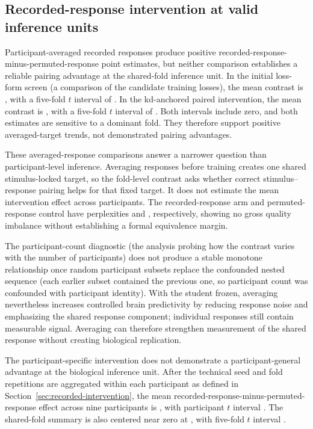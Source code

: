 \subsection{Recorded-response intervention at valid inference units}
\label{sec:results-recorded}

Participant-averaged recorded responses produce positive recorded-response-minus-permuted-response point estimates, but neither comparison establishes a reliable pairing advantage at the shared-fold inference unit.
In the initial loss-form screen (a comparison of the candidate training losses), the mean contrast is , with a five-fold \(t\) interval of .
In the \ac{kd}-anchored paired intervention, the mean contrast is , with a five-fold \(t\) interval of .
Both intervals include zero, and both estimates are sensitive to a dominant fold.
They therefore support positive averaged-target trends, not demonstrated pairing advantages.

These averaged-response comparisons answer a narrower question than participant-level inference.
Averaging responses before training creates one shared stimulus-locked target, so the fold-level contrast asks whether correct stimulus--response pairing helps for that fixed target.
It does not estimate the mean intervention effect across participants.
The recorded-response arm and permuted-response control have perplexities  and , respectively, showing no gross quality imbalance without establishing a formal equivalence margin.

The participant-count diagnostic (the analysis probing how the contrast varies with the number of participants) does not produce a stable monotone relationship once random participant subsets replace the confounded nested sequence (each earlier subset contained the previous one, so participant count was confounded with participant identity).
With the student frozen, averaging nevertheless increases controlled brain predictivity by reducing response noise and emphasizing the shared response component; individual responses still contain measurable signal.
Averaging can therefore strengthen measurement of the shared response without creating biological replication.

The participant-specific intervention does not demonstrate a participant-general advantage at the biological inference unit.
After the technical seed and fold repetitions are aggregated within each participant as defined in Section~\ref{sec:recorded-intervention}, the mean recorded-response-minus-permuted-response effect across nine participants is , with participant \(t\) interval .
The shared-fold summary is also centered near zero at , with five-fold \(t\) interval .

